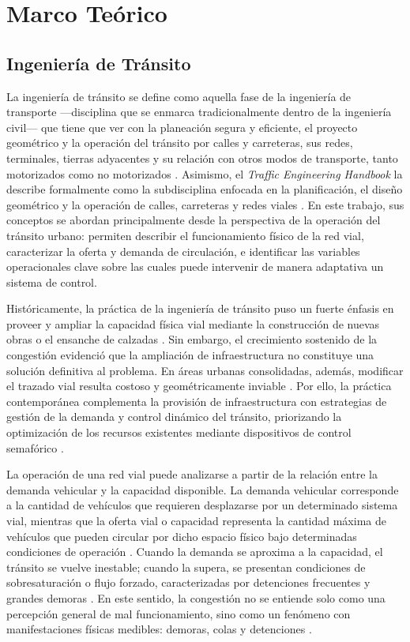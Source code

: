 \chapter{Marco Teórico}\label{cap:marco_teorico}

\section{Ingeniería de Tránsito}\label{sec:ingenieria_transito}

La ingeniería de tránsito se define como aquella fase de la ingeniería de transporte —disciplina que se enmarca tradicionalmente dentro de la ingeniería civil— que tiene que ver con la planeación segura y eficiente, el proyecto geométrico y la operación del tránsito por calles y carreteras, sus redes, terminales, tierras adyacentes y su relación con otros modos de transporte, tanto motorizados como no motorizados \cite[p.~33]{calymayor}. Asimismo, el \textit{Traffic Engineering Handbook} la describe formalmente como la subdisciplina enfocada en la planificación, el diseño geométrico y la operación de calles, carreteras y redes viales \cite[p.~1]{ite_handbook}. En este trabajo, sus conceptos se abordan principalmente desde la perspectiva de la operación del tránsito urbano: permiten describir el funcionamiento físico de la red vial, caracterizar la oferta y demanda de circulación, e identificar las variables operacionales clave sobre las cuales puede intervenir de manera adaptativa un sistema de control.

Históricamente, la práctica de la ingeniería de tránsito puso un fuerte énfasis en proveer y ampliar la capacidad física vial mediante la construcción de nuevas obras o el ensanche de calzadas \cite[Cap.~1]{ite_handbook}. Sin embargo, el crecimiento sostenido de la congestión evidenció que la ampliación de infraestructura no constituye una solución definitiva al problema. En áreas urbanas consolidadas, además, modificar el trazado vial resulta costoso y geométricamente inviable \cite[Cap.~2]{calymayor}. Por ello, la práctica contemporánea complementa la provisión de infraestructura con estrategias de gestión de la demanda \cite{ite_handbook} y control dinámico del tránsito, priorizando la optimización de los recursos existentes mediante dispositivos de control semafórico \cite{calymayor}.

La operación de una red vial puede analizarse a partir de la relación entre la demanda vehicular y la capacidad disponible. La demanda vehicular corresponde a la cantidad de vehículos que requieren desplazarse por un determinado sistema vial, mientras que la oferta vial o capacidad representa la cantidad máxima de vehículos que pueden circular por dicho espacio físico bajo determinadas condiciones de operación \cite[Cap.~2, Sec.~2.4]{calymayor}. Cuando la demanda se aproxima a la capacidad, el tránsito se vuelve inestable; cuando la supera, se presentan condiciones de sobresaturación o flujo forzado, caracterizadas por detenciones frecuentes y grandes demoras \cite[Cap.~2, Sec.~2.4]{calymayor}. En este sentido, la congestión no se entiende solo como una percepción general de mal funcionamiento, sino como un fenómeno con manifestaciones físicas medibles: demoras, colas y detenciones \cite[Cap.~1, Sec.~1.1]{fernandez}.

